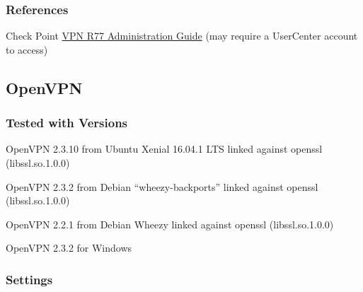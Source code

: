 

\subsubsection{References}
\begin{itemize*}
  \item Check Point \href{https://sc1.checkpoint.com/documents/R77/CP_R77_VPN_AdminGuide/html_frameset.htm}{VPN R77 Administration Guide} (may require a UserCenter account to access)
\end{itemize*}


\FloatBarrier %

\subsection{OpenVPN}

\subsubsection{Tested with Versions}
\begin{itemize*}
  \item OpenVPN 2.3.10 from Ubuntu Xenial 16.04.1 LTS linked against openssl (libssl.so.1.0.0)
  \item OpenVPN 2.3.2 from Debian ``wheezy-backports'' linked against openssl (libssl.so.1.0.0)
  \item OpenVPN 2.2.1 from Debian Wheezy linked against openssl (libssl.so.1.0.0)
  \item OpenVPN 2.3.2 for Windows
\end{itemize*}

\subsubsection{Settings}

